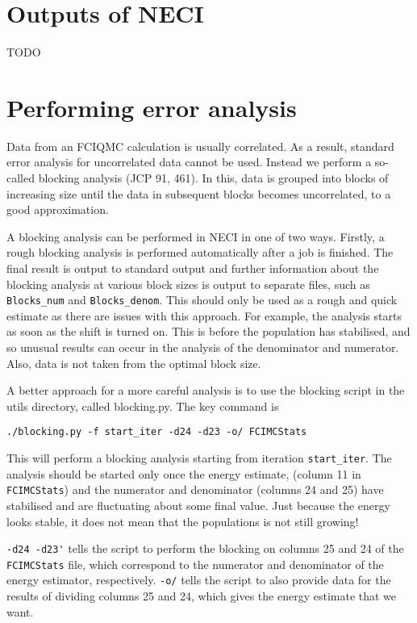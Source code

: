\documentclass[a4paper,notitlepage]{scrreprt}
\let\code\lstinline
\begin{document}
\section{Outputs of NECI}

TODO

\section{Performing error analysis}
    Data from an FCIQMC calculation is usually correlated. As a result,
    standard error analysis for uncorrelated data cannot be used. Instead we
    perform a so-called blocking analysis (JCP 91, 461). In this, data is
    grouped into blocks of increasing size until the data in subsequent blocks
    becomes uncorrelated, to a good approximation.

    A blocking analysis can be performed in NECI in one of two ways. Firstly,
    a rough blocking analysis is performed automatically after a job is finished.
    The final result is output to standard output and further information about
    the blocking analysis at various block sizes is output to separate files,
	such as \code{Blocks_num} and \code{Blocks_denom}. This should only be
	used as a rough
    and quick estimate as there are issues with this approach. For example, the
    analysis starts as soon as the shift is turned on. This is before the
    population has stabilised, and so unusual results can occur in the analysis
    of the denominator and numerator. Also, data is not taken from the optimal
    block size.

    A better approach for a more careful analysis is to use the blocking script
    in the utils directory, called blocking.py. The key command is
	\begin{lstlisting}[gobble=4]
		./blocking.py -f start_iter -d24 -d23 -o/ FCIMCStats
    \end{lstlisting}

	This will perform a blocking analysis starting from iteration
	\code{start_iter}.
    The analysis should be started only once the energy estimate, (column 11 in
	\code{FCIMCStats}) and the numerator and denominator (columns 24 and
	25) have
    stabilised and are fluctuating about some final value. Just because the
    energy looks stable, it does not mean that the populations is not still
    growing!

	\code{-d24 -d23'} tells the script to perform the blocking on columns 25 and
	24 of the \code{FCIMCStats} file, which correspond to the numerator and
	denominator of the energy estimator, respectively. \code{-o/} tells the script
    to also provide data for the results of dividing columns 25 and 24, which
    gives the energy estimate that we want.
\end{document}
